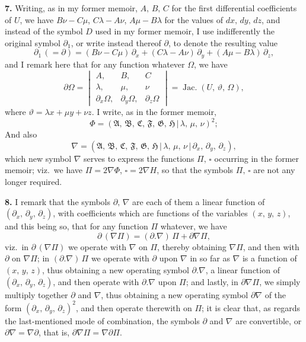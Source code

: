 \documentclass[11pt,a4paper]{article}
\providecommand{\mid}{\,|\,}
\providecommand{\Jac}{\operatorname{Jac.}}
\begin{document}
\textbf{7.} Writing, as in my former memoir, $A,\,B,\,C$ for the first differential coefficients of $U$, we have $B\nu - C\mu$, $C\lambda - A\nu$, $A\mu - B\lambda$ for the values of $dx,\,dy,\,dz$, and instead of the symbol $D$ used in my former memoir, I use indifferently the original symbol $\partial_{1}$, or write instead thereof $\partial$, to denote the resulting value
\[
\partial_{1}\,(= \partial) = (B\nu - C\mu)\,\partial_{x} + (C\lambda - A\nu)\,\partial_{y} + (A\mu - B\lambda)\,\partial_{z},
\]
and I remark here that for any function whatever $\Omega$, we have
\[
\partial\Omega = \begin{vmatrix} A, & B, & C \\ \lambda, & \mu, & \nu \\ \partial_{x}\Omega, & \partial_{y}\Omega, & \partial_{z}\Omega \end{vmatrix} = \Jac(U,\,\vartheta,\,\Omega),
\]
where $\vartheta = \lambda x + \mu y + \nu z$. I write, as in the former memoir,
\[
\Phi = (\mathfrak{A},\,\mathfrak{B},\,\mathfrak{C},\,\mathfrak{F},\,\mathfrak{G},\,\mathfrak{H}\mid \lambda,\,\mu,\,\nu)^{2};
\]
And also
\[
\nabla = (\mathfrak{A},\,\mathfrak{B},\,\mathfrak{C},\,\mathfrak{F},\,\mathfrak{G},\,\mathfrak{H}\mid \lambda,\,\mu,\,\nu\mid \partial_{x},\,\partial_{y},\,\partial_{z}),
\]
which new symbol $\nabla$ serves to express the functions $\Pi,\,\square$ occurring in the former memoir; viz.\ we have $\Pi = 2\nabla\Phi$, $\square = 2\nabla H$, so that the symbols $\Pi,\,\square$ are not any longer required.

\medskip

\textbf{8.} I remark that the symbols $\partial,\,\nabla$ are each of them a linear function of $(\partial_{x},\,\partial_{y},\,\partial_{z})$, with coefficients which are functions of the variables $(x,\,y,\,z)$, and this being so, that for any function $\Pi$ whatever, we have
\[
\partial\,(\nabla\Pi) = (\partial.\nabla)\,\Pi + \partial\nabla\Pi,
\]
viz.\ in $\partial\,(\nabla\Pi)$ we operate with $\nabla$ on $\Pi$, thereby obtaining $\nabla\Pi$, and then with $\partial$ on $\nabla\Pi$; in $(\partial.\nabla)\,\Pi$ we operate with $\partial$ upon $\nabla$ in so far as $\nabla$ is a function of $(x,\,y,\,z)$, thus obtaining a new operating symbol $\partial.\nabla$, a linear function of $(\partial_{x},\,\partial_{y},\,\partial_{z})$, and then operate with $\partial.\nabla$ upon $\Pi$; and lastly, in $\partial\nabla\Pi$, we simply multiply together $\partial$ and $\nabla$, thus obtaining a new operating symbol $\partial\nabla$ of the form $(\partial_{x},\,\partial_{y},\,\partial_{z})^{2}$, and then operate therewith on $\Pi$; it is clear that, as regards the last-mentioned mode of combination, the symbols $\partial$ and $\nabla$ are convertible, or $\partial\nabla = \nabla\partial$, that is, $\partial\nabla\Pi = \nabla\partial\Pi$.
\end{document}

